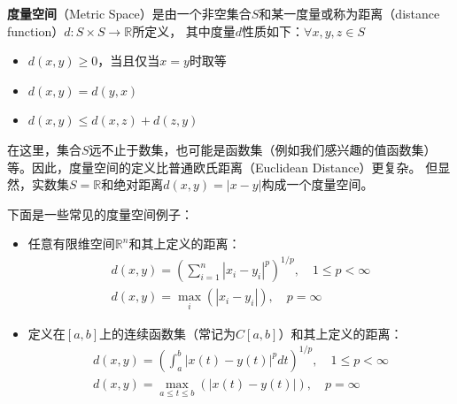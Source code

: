 \begin{definition}
    \textbf{度量空间}（Metric Space）是由一个非空集合$S$和某一度量或称为距离（distance function）$d: S \times S \rightarrow \mathbb{R}$所定义，
    其中度量$d$性质如下：$\forall x,y,z \in S$
    \begin{itemize}
        \item $d\left(x,y\right) \geq 0$，当且仅当$x=y$时取等
        \item $d\left(x,y\right) = d\left(y,x\right)$
        \item $d(x,y) \leq d\left(x,z\right)+d\left(z,y\right) $
    \end{itemize}
\end{definition}
在这里，集合$S$远不止于数集，也可能是函数集（例如我们感兴趣的值函数集）等。因此，度量空间的定义比普通欧氏距离（Euclidean Distance）更复杂。
但显然，实数集$S = \mathbb{R}$和绝对距离$d\left(x,y\right)=\left|x-y\right|$构成一个度量空间。
\begin{example}
    下面是一些常见的度量空间例子：
    \begin{itemize}
        \item 任意有限维空间$\mathbb{R}^n$和其上定义的距离：
            \begin{gather*}
                d\left(x,y\right) = \left(\sum_{i=1}^{n} \left|x_i-y_i\right|^p\right)^{1/p}, \quad 1 \leq p < \infty \\
                d\left(x,y\right) = \max _i \left(\left|x_i-y_i\right|\right), \quad p=\infty
            \end{gather*}

        \item 定义在$\left[a,b\right]$上的连续函数集（常记为$C\left[a,b\right]$）和其上定义的距离：     
            \begin{gather*}
                d\left(x,y\right)=\left(\int_{a}^{b} \left|x\left(t\right)-y\left(t\right)\right|^{p}dt\right)^{1/p}, \quad 1 \leq p < \infty \\
                d\left(x,y\right) = \max_{a\leq t \leq b} \left(\left|x\left(t\right)-y\left(t\right)\right|\right), \quad p = \infty
            \end{gather*}

    \end{itemize}
\end{example}

